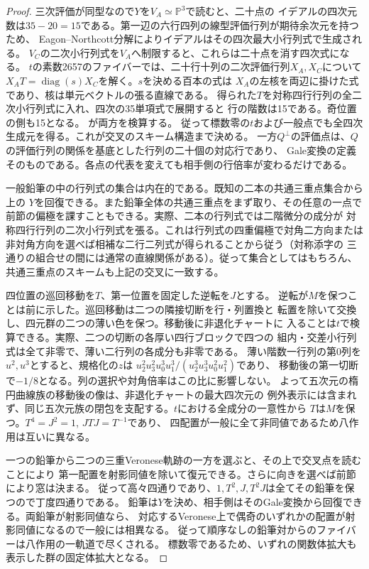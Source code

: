 \begin{proof}
三次評価が同型なので$Y$を$V_A\simeq\mathbb P^3$で読むと、二十点の
イデアルの四次元数は$35-20=15$である。第一辺の六行四列の線型評価行列が期待余次元を持つため、
Eagon--Northcott分解によりイデアルはその四次最大小行列式で生成される。
$V_C$の二次小行列式を$V_A$へ制限すると、これらは二十点を消す四次式になる。
$t$の素数2657のファイバーでは、二十行十列の二次評価行列$X_A,X_C$について
$X_A T=\operatorname{diag}(s)X_C$を解く。$s$を決める百本の式は
$X_A$の左核を両辺に掛けた式であり、核は単元ベクトルの張る直線である。
得られた$T$を対称四行行列の全二次小行列式に入れ、四次の35単項式で展開すると
行の階数は15である。奇位置の側も15となる。
が両方を検算する。
従って標数零の$t$および一般点でも全四次生成元を得る。これが交叉のスキーム構造まで決める。
一方$Q^\perp$の評価点は、$Q$の評価行列の関係を基底とした行列の二十個の対応行であり、
Gale変換の定義そのものである。各点の代表を変えても相手側の行倍率が変わるだけである。

一般鉛筆の中の行列式の集合は内在的である。既知の二本の共通三重点集合から上の
$Y$を回復できる。また鉛筆全体の共通三重点をまず取り、その任意の一点で
前節の偏極を課すこともできる。実際、二本の行列式では二階微分の成分が
対称四行行列の二次小行列式を張る。これは行列式の四重偏極で対角二方向または
非対角方向を選べば相補な二行二列式が得られることから従う（対称添字の
三通りの組合せの間には通常の直線関係がある）。従って集合としてはもちろん、
共通三重点のスキームも上記の交叉に一致する。

四位置の巡回移動を$T$、第一位置を固定した逆転を$J$とする。
逆転が$M$を保つことは前に示した。巡回移動は二つの隣接切断を行・列置換と
転置を除いて交換し、四元群の二つの薄い色を保つ。移動後に非退化チャートに
入ることは$t$で検算できる。実際、二つの切断の各厚い四行ブロックで四つの
組内・交差小行列式は全て非零で、薄い二行列の各成分も非零である。
薄い階数一行列の第0列を$u^2,u^3$とすると、規格化の$z$は
$u^2_2u^2_3u^3_0u^3_1/(u^3_2u^3_3u^2_0u^2_1)$であり、
移動後の第一切断で$-1/8$となる。列の選択や対角倍率はこの比に影響しない。
よって五次元の楕円曲線族の移動後の像は、非退化チャートの最大四次元の
例外表示には含まれず、同じ五次元族の閉包を支配する。$t$における全成分の一意性から
$T$は$M$を保つ。$T^4=J^2=1$, $JTJ=T^{-1}$であり、
四配置が一般に全て非同値であるため八作用は互いに異なる。

一つの鉛筆から二つの三重Veronese軌跡の一方を選ぶと、その上で交叉点を読むことにより
第一配置を射影同値を除いて復元できる。さらに向きを選べば前節により窓は決まる。
従って高々四通りであり、$1,T^2,J,T^2J$は全てその鉛筆を保つので丁度四通りである。
鉛筆は$Y$を決め、相手側はそのGale変換から回復できる。両鉛筆が射影同値なら、
対応するVeronese上で偶奇のいずれかの配置が射影同値になるので一般には相異なる。
従って順序なしの鉛筆対からのファイバーは八作用の一軌道で尽くされる。
標数零であるため、いずれの関数体拡大も表示した群の固定体拡大となる。
\end{proof}

